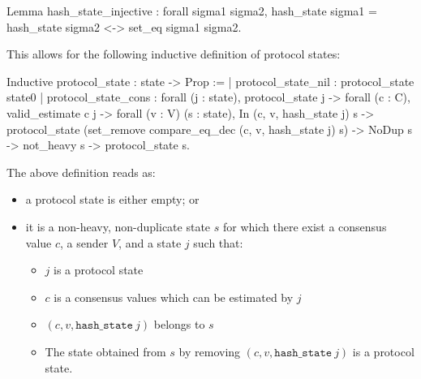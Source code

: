 \begin{coq}
Lemma hash_state_injective : forall sigma1 sigma2,
  hash_state sigma1 = hash_state sigma2
  <->
  set_eq sigma1 sigma2.
\end{coq}    

This allows for the following inductive definition of protocol states:

\begin{coq}
Inductive protocol_state : state -> Prop :=
| protocol_state_nil : protocol_state state0
| protocol_state_cons : forall (j : state),
    protocol_state j ->
    forall (c : C),
      valid_estimate c j ->
      forall (v : V) (s : state),
        In (c, v, hash_state j) s ->
        protocol_state (set_remove compare_eq_dec (c, v, hash_state j) s) ->
        NoDup s ->
        not_heavy s ->
        protocol_state s.
\end{coq}

The above definition reads as:
\begin{itemize}
    \item a protocol state is either empty; or
    \item it is a non-heavy, non-duplicate state $s$ for which
        there exist a consensus value $c$, a sender $V$, and a state $j$ such that:
        \begin{itemize}
            \item $j$ is a protocol state
            \item $c$ is a consensus values which can be estimated by $j$
            \item $(c,v, \texttt{hash\_state}\  j)$ belongs to $s$
            \item The state obtained from $s$ by removing
                $(c,v, \texttt{hash\_state}\  j)$ is a protocol state.
        \end{itemize}
\end{itemize}

